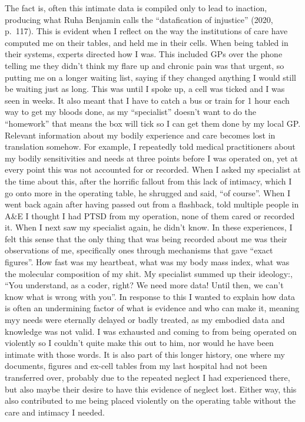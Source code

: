 The fact is, often this intimate data is compiled only to lead to
inaction, producing what Ruha Benjamin calls the ``datafication of
injustice'' (2020, p.~117). This is evident when I reflect on the way
the institutions of care have computed me on their tables, and held me
in their cells. When being tabled in their systems, experts directed how
I was. This included GPs over the phone telling me they didn't think my
flare up and chronic pain was that urgent, so putting me on a longer
waiting list, saying if they changed anything I would still be waiting
just as long. This was until I spoke up, a cell was ticked and I was
seen in weeks. It also meant that I have to catch a bus or train for 1
hour each way to get my bloods done, as my ``specialist'' doesn't want
to do the ``homework'' that means the box will tick so I can get them
done by my local GP. Relevant information about my bodily experience and
care becomes lost in translation somehow. For example, I repeatedly told
medical practitioners about my bodily sensitivities and needs at three
points before I was operated on, yet at every point this was not
accounted for or recorded. When I asked my specialist at the time about
this, after the horrific fallout from this lack of intimacy, which I go
onto more in the operating table, he shrugged and said, ``of course''.
When I went back again after having passed out from a flashback, told
multiple people in A\&E I thought I had PTSD from my operation, none of
them cared or recorded it. When I next saw my specialist again, he
didn't know. In these experiences, I felt this sense that the only thing
that was being recorded about me was their observations of me,
specifically ones through mechanisms that gave ``exact figures''. How
fast was my heartbeat, what was my body mass index, what was the
molecular composition of my shit. My specialist summed up their
ideology:, ``You understand, as a coder, right? We need more data! Until
then, we can't know what is wrong with you''. In response to this I
wanted to explain how data is often an undermining factor of what is
evidence and who can make it, meaning myy needs were eternally delayed
or badly treated, as my embodied data and knowledge was not valid. I was
exhausted and coming to from being operated on violently so I couldn't
quite make this out to him, nor would he have been intimate with those
words. It is also part of this longer history, one where my documents,
figures and ex-cell tables from my last hospital had not been
transferred over, probably due to the repeated neglect I had experienced
there, but also maybe their desire to have this evidence of neglect
lost. Either way, this also contributed to me being placed violently on
the operating table without the care and intimacy I needed.

